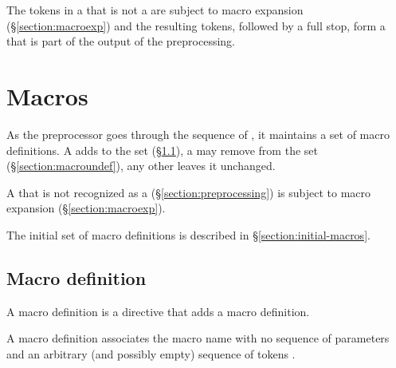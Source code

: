 The tokens in a  that is not a  are
subject to macro expansion
(\S\ref{section:macroexp}) and the resulting tokens, followed by a
full stop, form a  that is part of the output of the
preprocessing.

\section{Macros}

\label{section:macros}

As the preprocessor goes through the sequence of ,
it maintains a set of macro definitions.  A  adds
to the set (\S\ref{section:macrodef}), a  may
remove from the set (\S\ref{section:macroundef}), any other
 leaves it unchanged.

A  that is not recognized as a 
(\S\ref{section:preprocessing}) is subject to macro expansion
(\S\ref{section:macroexp}).

The initial set of macro definitions is described in \S\ref{section:initial-macros}.

\subsection{Macro definition}

\label{section:macrodef}

A macro definition is a directive that adds a macro definition.

\begin{rules}
       {\TXT{-}  \TXT{(}  
       \TXT{,}  \TXT{)} }

      { \OR
       }

       {\TXT{(}  \TXT{)}}

       { \OR
         \TXT{,} }

       {}
\end{rules}

A macro definition  associates the macro
name  with no sequence of parameters and an arbitrary (and
possibly empty) sequence of tokens .

